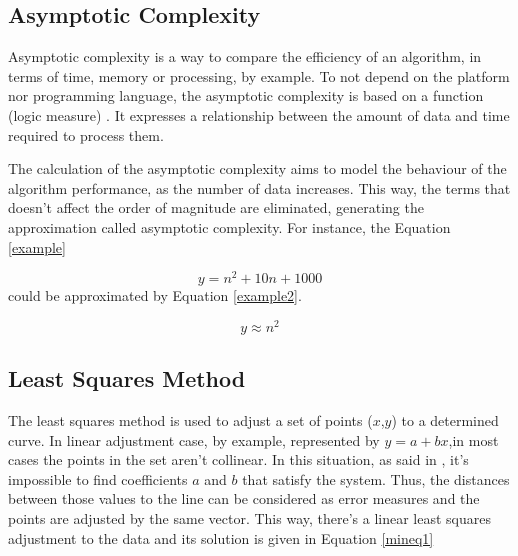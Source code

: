 \documentclass[10pt, conference, compsocconf]{IEEEtran}
\begin{document}
{\subsection{Asymptotic Complexity }

Asymptotic complexity is a way to compare the efficiency of an algorithm,
in terms of time, memory or processing, by example. To not depend on the
platform nor programming language, the asymptotic complexity is based on
a function (logic measure) \cite{complexidade}. It expresses a relationship between the amount
of data and time required to process them. 

The calculation of the asymptotic complexity aims to model the behaviour
of the algorithm performance, as the number of data increases. This way,
the terms that doesn't affect the order of magnitude are eliminated,
generating the approximation called asymptotic complexity. For instance, the Equation \ref{example}

    \begin{equation}
		y = n^{2} +10 n + 1000
	\label{example}
	\end{equation}
could be approximated by Equation \ref{example2}.

\begin{equation}
		y \approx  n^{2} 
	\label{example2}
	\end{equation}

\subsection{Least Squares Method}

The least squares method is used to adjust a set of points ($x$,$y$) to a
determined curve. In linear adjustment case, by example, represented by $y = a + bx$,in most cases the points in the set aren't collinear. 
In this situation, as said in \cite{minq}, it's impossible to find coefficients
$a$ and $b$ that satisfy the system. Thus, the distances between those values
to the line can be considered as error measures and the points are adjusted 
by the same vector. This way, there's a linear least 
squares adjustment to the data and its solution is given in Equation \ref{mineq1}

}
\end{document}
